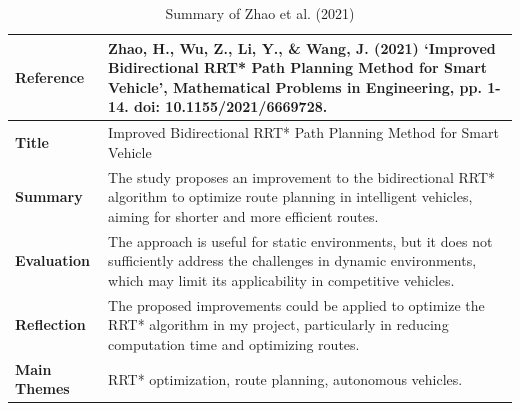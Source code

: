 \documentclass[a4paper,11pt]{report}
\begin{document}
\begin{table}[H]
    \centering
    \begin{tabular}{|p{3cm}|p{10cm}|}
        \hline
        \textbf{Reference} & Zhao, H., Wu, Z., Li, Y., \& Wang, J. (2021) ‘Improved Bidirectional RRT* Path Planning Method for Smart Vehicle’, Mathematical Problems in Engineering, pp. 1-14. doi: 10.1155/2021/6669728. \\ \hline
        \textbf{Title} & Improved Bidirectional RRT* Path Planning Method for Smart Vehicle \\ \hline
        \textbf{Summary} & The study proposes an improvement to the bidirectional RRT* algorithm to optimize route planning in intelligent vehicles, aiming for shorter and more efficient routes. \\ \hline
        \textbf{Evaluation} & The approach is useful for static environments, but it does not sufficiently address the challenges in dynamic environments, which may limit its applicability in competitive vehicles. \\ \hline
        \textbf{Reflection} & The proposed improvements could be applied to optimize the RRT* algorithm in my project, particularly in reducing computation time and optimizing routes. \\ \hline
        \textbf{Main Themes} & RRT* optimization, route planning, autonomous vehicles. \\ \hline
    \end{tabular}
    \caption{Summary of Zhao et al. (2021)}
    \label{tab:zhao2021}
\end{table}
\end{document}
